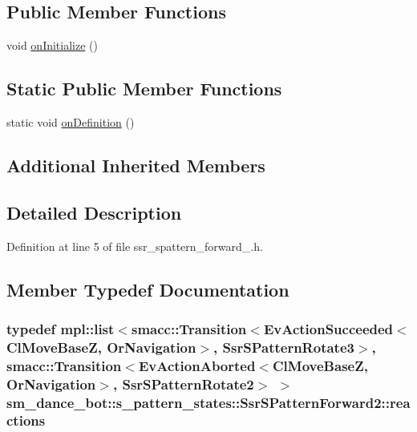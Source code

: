 \subsection*{Public Member Functions}
\begin{DoxyCompactItemize}
\item 
void \hyperlink{structsm__dance__bot_1_1s__pattern__states_1_1SsrSPatternForward2_afdf64ebb6ba6130f1cf5a2a89f2d44e3}{on\+Initialize} ()
\end{DoxyCompactItemize}
\subsection*{Static Public Member Functions}
\begin{DoxyCompactItemize}
\item 
static void \hyperlink{structsm__dance__bot_1_1s__pattern__states_1_1SsrSPatternForward2_a0ec735e6986c43d0b4528c990551a7e5}{on\+Definition} ()
\end{DoxyCompactItemize}
\subsection*{Additional Inherited Members}


\subsection{Detailed Description}


Definition at line 5 of file ssr\+\_\+spattern\+\_\+forward\+\_.\+h.



\subsection{Member Typedef Documentation}
\subsubsection[{\texorpdfstring{reactions}{reactions}}]{\setlength{\rightskip}{0pt plus 5cm}typedef mpl\+::list$<${\bf smacc\+::\+Transition}$<$Ev\+Action\+Succeeded$<${\bf Cl\+Move\+BaseZ}, {\bf Or\+Navigation}$>$, {\bf Ssr\+S\+Pattern\+Rotate3}$>$, {\bf smacc\+::\+Transition}$<$Ev\+Action\+Aborted$<${\bf Cl\+Move\+BaseZ}, {\bf Or\+Navigation}$>$, {\bf Ssr\+S\+Pattern\+Rotate2}$>$ $>$ {\bf sm\+\_\+dance\+\_\+bot\+::s\+\_\+pattern\+\_\+states\+::\+Ssr\+S\+Pattern\+Forward2\+::reactions}}\hypertarget{structsm__dance__bot_1_1s__pattern__states_1_1SsrSPatternForward2_a06f8b4f719c4d6a85429b8ed734b9a01}{}\label{structsm__dance__bot_1_1s__pattern__states_1_1SsrSPatternForward2_a06f8b4f719c4d6a85429b8ed734b9a01}


